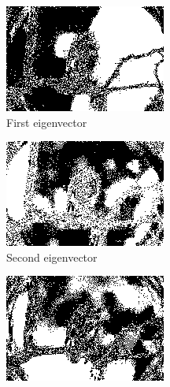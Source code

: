 \documentclass[11pt]{article}
\begin{document}
\begin{figure}
\centering
\graphicspath{{../code/}}
\begin{subfigure}[b]{0.4\textwidth}
\centering
\includegraphics[width=\textwidth]{hawk_5_seg_ev1}
\caption{First eigenvector}
\label{fig:ev1:r5}
\end{subfigure}
\begin{subfigure}[b]{0.4\textwidth}
\centering
\includegraphics[width=\textwidth]{hawk_5_seg}
\caption{Second eigenvector}
\label{fig:ev2:r5}
\end{subfigure}
\begin{subfigure}[b]{0.4\textwidth}
\centering
\includegraphics[width=\textwidth]{hawk_5_seg_ev3}

\end{subfigure}
\end{figure}
\end{document}
